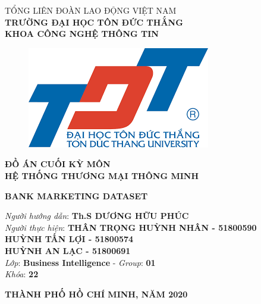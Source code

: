 \documentclass{report}
\begin{document}
\begin{center}
	\fontsize{14}{20}\selectfont
	\textsc{TỔNG LIÊN ĐOÀN LAO ĐỘNG VIỆT NAM\\ 
		\textbf{TRƯỜNG ĐẠI HỌC TÔN ĐỨC THẮNG\\} 
		\textbf{KHOA CÔNG NGHỆ THÔNG TIN}}
	
	\vspace{0.08cm}
	\begin{figure}[htp]
		\begin{center}
			\includegraphics[scale=0.5]{image/logo tdt.png}
		\end{center}
	\end{figure}
	
	\fontsize{15}{20}\selectfont\textbf{ĐỒ ÁN CUỐI KỲ MÔN\\HỆ THỐNG THƯƠNG MẠI THÔNG MINH\\}
	
	\vspace{2cm}
	\fontsize{24}{20}\selectfont\textbf{BANK MARKETING DATASET}
\end{center}
\vspace{1.5cm}

\begin{flushright}
	\fontsize{14}{20}\selectfont
	\textit{Người hướng dẫn}: \textbf{Th.S DƯƠNG HỮU PHÚC}\\
	\textit{Người thực hiện}:
	\textbf{THÂN TRỌNG HUỲNH NHÂN - 51800590}\\
	\textbf{HUỲNH TẤN LỢI - 51800574}\\
	\textbf{HUỲNH AN LẠC - 51800691}\\
	\textit{Lớp}: \textbf{Business Intelligence} - \textit{Group}: \textbf{01}\\
	\textit{Khóa}: \textbf{22}\\
\end{flushright}
\vspace{2cm}
\begin{center}
	\fontsize{14}{20}\selectfont
	\textbf{THÀNH PHỐ HỒ CHÍ MINH, NĂM 2020}
\end{center}
\pagebreak
\end{document}
